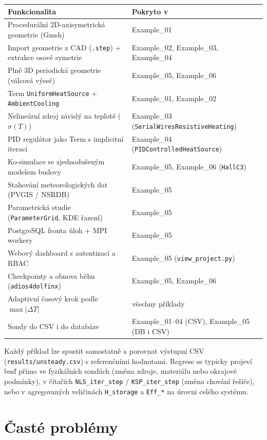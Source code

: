 \documentclass[a4paper,11pt]{article}
\begin{document}
\begin{longtable}{@{}L{6.0cm} L{9.0cm}@{}}
\toprule
\textbf{Funkcionalita} & \textbf{Pokryto v} \\
\midrule
\endhead
Procedurální 2D-axisymetrická geometrie (Gmsh)
  & Example\_01 \\
Import geometrie z CAD (\texttt{.step}) + extrakce osové symetrie
  & Example\_02, Example\_03, Example\_04 \\
Plně 3D periodická geometrie (válcová výseč)
  & Example\_05, Example\_06 \\
Term \texttt{UniformHeatSource} + \texttt{AmbientCooling}
  & Example\_01, Example\_02 \\
Nelineární zdroj závislý na teplotě (\(\sigma(T)\))
  & Example\_03 (\texttt{SerialWiresResistiveHeating}) \\
PID regulátor jako Term s implicitní iterací
  & Example\_04 (\texttt{PIDControlledHeatSource}) \\
Ko-simulace se zjednodušeným modelem budovy
  & Example\_05, Example\_06 (\texttt{HallC3}) \\
Stahování meteorologických dat (PVGIS / NSRDB)
  & Example\_05 \\
Parametrická studie (\texttt{ParameterGrid}, KDE řazení)
  & Example\_05 \\
PostgreSQL fronta úloh + MPI workery
  & Example\_05 \\
Webový dashboard s autentizací a RBAC
  & Example\_05 (\texttt{view\_project.py}) \\
Checkpointy a obnova běhu (\texttt{adios4dolfinx})
  & Example\_05, Example\_06 \\
Adaptivní časový krok podle \(\max|\Delta T|\)
  & všechny příklady \\
Sondy do CSV i do databáze
  & Example\_01--04 (CSV), Example\_05 (DB i CSV) \\
\bottomrule
\end{longtable}

Každý příklad lze spustit samostatně a porovnat výstupní CSV
(\texttt{results/unsteady.csv}) s referenčními hodnotami. Regrese se typicky
projeví buď přímo ve fyzikálních sondách (změna zdroje, materiálu nebo okrajové
podmínky), v čítačích \texttt{NLS\_iter\_step} / \texttt{KSP\_iter\_step}
(změna chování řešiče), nebo v agregovaných veličinách \texttt{H\_storage}
a \texttt{Eff\_*} na úrovni celého systému.

\section{Časté problémy}\label{sec:faq}
\end{document}
